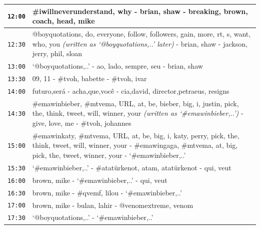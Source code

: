 \documentclass{sig-alternate}
\begin{document}
 \begin{table}
\centering
\small
\begin{tabular}{|p{.6cm}|p{7.5cm}|}
\hline %
\texttt{12:00} &   \#iwillneverunderstand, why -   brian, shaw -   breaking, brown, coach, head, mike \\\hline
\texttt{12:30} &   @boyquotations, do, everyone, follow, followers, gain, more, rt, s, want, who, you \emph{(written as `@boyquotations,..' later)}  -   brian, shaw -   jackson, jerry, phil, sloan \\\hline

\texttt{13:00} &    `@boyquotations,..' -   ao, lado, sempre, seu -   brian, shaw \\\hline

\texttt{13:30} &   09, 11 -   \#tvoh, babette -   \#tvoh, ivar \\\hline

\texttt{14:00} &   futuro,ser\'{a} -   acha,que,voc\^{e} -   cia,david, director,petraeus, resigns \\\hline

\texttt{14:30} &   \#emawinbieber, \#mtvema, URL, at, be, bieber, big, i, justin, pick, the, think, tweet, will, winner, your \emph{(written as `\#emawinbieber,..')} -   give, love, me -   \#tvoh, johannes \\\hline

\texttt{15:00} &   \#emawinkaty, \#mtvema, URL, at, be, big, i, katy, perry, pick, the, think, tweet, will, winner, your -   \#emawingaga, \#mtvema, at, big, pick, the, tweet, winner, your -   `\#emawinbieber,..' \\\hline

\texttt{15:30} &   `\#emawinbieber,..' -   \#atat\"{u}rkenot, atam, atat\"{u}rkenot -   qui, veut \\\hline

\texttt{16:00} &   brown, mike -   `\#emawinbieber,..' -   qui, veut \\\hline

\texttt{16:30} &   brown, mike -   \#qvemf, lilou -  `\#emawinbieber,..' \\\hline

\texttt{17:00} &   brown, mike -   bulan, lahir -   @venomextreme, venom \\\hline

\texttt{17:30} &   `@boyquotations,..' -  `\#emawinbieber,..' \\\hline


\end{tabular}
\end{table}
\end{document}

